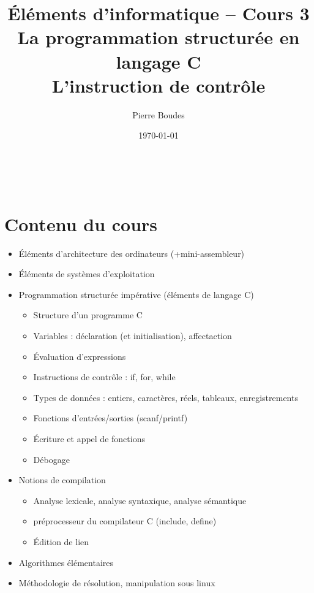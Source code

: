 \documentclass[xcolor=svgnames]{beamer}
\title{Éléments d'informatique -- Cours 3 \\La programmation
  structurée en langage C\\ L'instruction de contrôle \C{if}}
\author{Pierre Boudes}
\date{\today}
\begin{document}
\begin{frame}
	\titlepage
	\vfill
	\begin{center}
		\\[2.5ex]
		{\tiny\CcNote{\CcLongnameByNcSa}}
		\vspace*{-2.5ex}
	\end{center}
\end{frame}

 \section*{Contenu du cours}
\begin{frame}
  \begin{itemize}
  \item Éléments d'architecture des ordinateurs (+mini-assembleur)\nowrite
  \item Éléments de systèmes d'exploitation
\item \alert{Programmation structurée impérative (éléments de langage C)}
\begin{itemize}
  \item \alert{Structure d'un programme C}
  \item \alert{Variables : déclaration (et initialisation), affectaction}
  \item \alert{Évaluation d'expressions}
  \item Instructions de contrôle : \alert{if}, for, while
  \item Types de données : entiers, caractères,
    réels, tableaux, enregistrements
  \item Fonctions d'entrées/sorties (scanf/printf)
  \item Écriture et appel de fonctions
  \item Débogage
\end{itemize}
\item Notions de compilation
  \begin{itemize}
  \item Analyse lexicale, analyse syntaxique, analyse sémantique
  \item préprocesseur du compilateur C (include, define)
   \item Édition de lien
  \end{itemize}
\item Algorithmes élémentaires
\item Méthodologie de résolution, manipulation sous linux
\end{itemize}
\end{frame}
\end{document}
